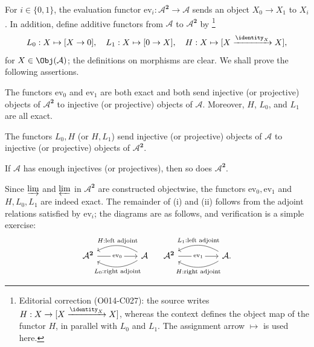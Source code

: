 \begin{example}
For $i\in\{0,1\}$, the evaluation functor
$\mathrm{ev}_i:\mathcal{A}^{\mathbf{2}}\to\mathcal{A}$ sends an object
$X_0\to X_1$ to $X_i$. In addition, define additive functors from
$\mathcal{A}$ to $\mathcal{A}^{\mathbf{2}}$ by
\footnote{Editorial correction (O014-C027): the source writes
$H:X\to[X\xrightarrow{\identity_X}X]$, whereas the context defines the object
map of the functor $H$, in parallel with $L_0$ and $L_1$. The assignment arrow
$\mapsto$ is used here.}
\[L_0:X\mapsto[X\to0],\quad L_1:X\mapsto[0\to X],\quad
H:X\mapsto[X\xrightarrow{\identity_X}X],\]
for $X\in\Obj(\mathcal{A})$; the definitions on morphisms are clear. We shall
prove the following assertions.
\begin{compactenum}[(i)]
	\item The functors $\mathrm{ev}_0$ and $\mathrm{ev}_1$ are both exact and
	both send injective (or projective) objects of
	$\mathcal{A}^{\mathbf{2}}$ to injective (or projective) objects of
	$\mathcal{A}$. Moreover, $H$, $L_0$, and $L_1$ are all exact.
	\item The functors $L_0,H$ (or $H,L_1$) send injective (or projective)
	objects of $\mathcal{A}$ to injective (or projective) objects of
	$\mathcal{A}^{\mathbf{2}}$.
	\item If $\mathcal{A}$ has enough injectives (or projectives), then so does
	$\mathcal{A}^{\mathbf{2}}$.
\end{compactenum}

Since $\varinjlim$ and $\varprojlim$ in $\mathcal{A}^{\mathbf{2}}$ are
constructed objectwise, the functors $\mathrm{ev}_0,\mathrm{ev}_1$ and
$H,L_0,L_1$ are indeed exact. The remainder of (i) and (ii) follows from the
adjoint relations satisfied by $\mathrm{ev}_i$; the diagrams are as follows,
and verification is a simple exercise:
\[\begin{tikzcd}[column sep=huge]
	\mathcal{A}^{\mathbf{2}} \arrow[r, "{\mathrm{ev}_0}" description] & \mathcal{A} \arrow[l, bend right, "{H: \text{left adjoint}}"'] \arrow[l, bend left, "L_0: \text{right adjoint}"] 
\end{tikzcd} \quad \begin{tikzcd}[column sep=huge]
	\mathcal{A}^{\mathbf{2}} \arrow[r, "{\mathrm{ev}_1}" description] & \mathcal{A} \arrow[l, bend right, "{L_1: \text{left adjoint}}"'] \arrow[l, bend left, "{H: \text{right adjoint}}"] .
\end{tikzcd}\]


\end{example}
